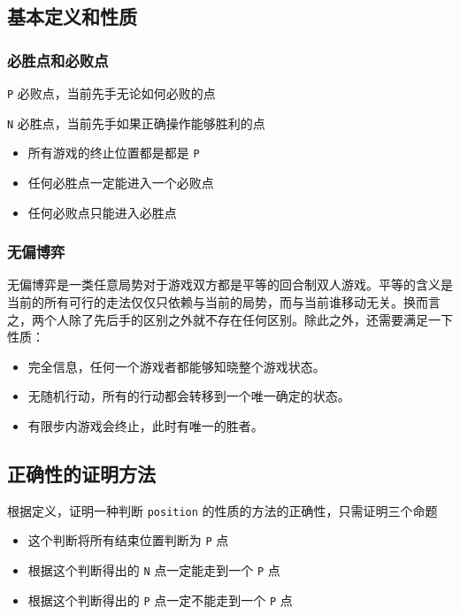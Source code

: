 \documentclass[UTF-8]{ctexart}
\begin{document}
	\subsection{基本定义和性质}
	\subsubsection{必胜点和必败点}
	
	\texttt{P} 必败点，当前先手无论如何必败的点  
	
	\texttt{N} 必胜点，当前先手如果正确操作能够胜利的点
	
	\begin{itemize}
		\item 所有游戏的终止位置都是都是 \texttt{P}   
		\item 任何必胜点一定能进入一个必败点  
		\item 任何必败点只能进入必胜点
	\end{itemize}
	
	\subsubsection{无偏博弈}
	
	无偏博弈是一类任意局势对于游戏双方都是平等的回合制双人游戏。平等的含义是当前的所有可行的走法仅仅只依赖与当前的局势，而与当前谁移动无关。换而言之，两个人除了先后手的区别之外就不存在任何区别。除此之外，还需要满足一下性质：  
	
	\begin{itemize}
		\item 完全信息，任何一个游戏者都能够知晓整个游戏状态。  
		\item 无随机行动，所有的行动都会转移到一个唯一确定的状态。  
		\item 有限步内游戏会终止，此时有唯一的胜者。
	\end{itemize}
	
	\subsection{正确性的证明方法}
	
	根据定义，证明一种判断 \texttt{position} 的性质的方法的正确性，只需证明三个命题
	
	\begin{itemize}
		\item 这个判断将所有结束位置判断为 \texttt{P} 点
		\item 根据这个判断得出的 \texttt{N} 点一定能走到一个 \texttt{P} 点
		\item 根据这个判断得出的 \texttt{P} 点一定不能走到一个 \texttt{P} 点
	\end{itemize}
\end{document}
